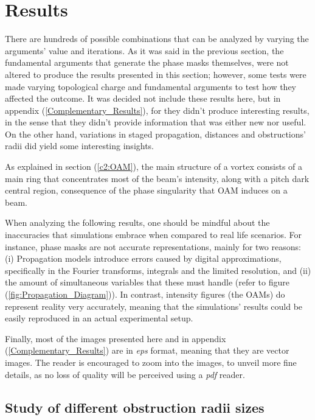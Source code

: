 \chapter{Results} \label{Results}
\label{c4} %

There are hundreds of possible combinations that can be analyzed by varying the arguments' value and iterations. As it was said in the previous section, the fundamental arguments that generate the phase masks themselves, were not altered to produce the results presented in this section; however, some tests were made varying topological charge and fundamental arguments to test how they affected the outcome. It was decided not include these results here, but in appendix (\ref{Complementary_Results}), for they didn't produce interesting results, in the sense that they didn't provide information that was either new nor useful. On the other hand, variations in staged propagation, distances and obstructions' radii did yield some interesting insights.

As explained in section (\ref{c2:OAM}), the main structure of a vortex consists of a main ring that concentrates most of the beam's intensity, along with a pitch dark central region, consequence of the phase singularity that OAM induces on a beam.

When analyzing the following results, one should be mindful about the inaccuracies that simulations embrace when compared to real life scenarios. For instance, phase masks are not accurate representations, mainly for two reasons: (i) Propagation models introduce errors caused by digital approximations, specifically in the Fourier transforms, integrals and the limited resolution, and (ii) the amount of simultaneous variables that these must handle (refer to figure (\ref{fig:Propagation_Diagram})). In contrast, intensity figures (the OAMs) do represent reality very accurately, meaning that the simulations' results could be easily reproduced in an actual experimental setup.

Finally, most of the images presented here and in appendix (\ref{Complementary_Results}) are in \textit{eps} format, meaning that they are vector images. The reader is encouraged to zoom into the images, to unveil more fine details, as no loss of quality will be perceived using a \textit{pdf} reader.

\section{Study of different obstruction radii sizes}
\label{c4: radii size variations}

